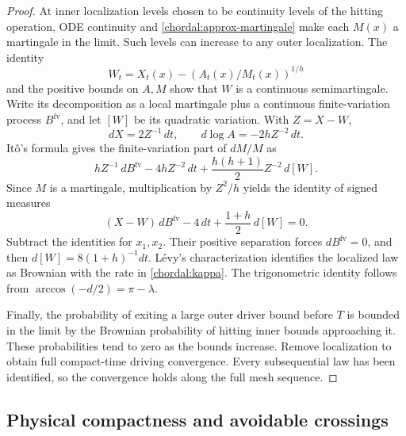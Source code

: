 \begin{proof}
At inner localization levels chosen to be continuity levels of the
hitting operation, ODE continuity and
\eqref{chordal:approx-martingale} make each $M(x)$ a martingale in
the limit.  Such levels can increase to any outer localization.
The identity
\[
 W_t=X_t(x)-\left(A_t(x)/M_t(x)\right)^{1/h}
\]
and the positive bounds on $A,M$ show that $W$ is a continuous
semimartingale.  Write its decomposition as a local martingale plus
a continuous finite-variation process $B^{\mathrm{fv}}$, and let
$[W]$ be its quadratic variation.  With $Z=X-W$,
\[
 dX=2Z^{-1}\,dt,\qquad d\log A=-2hZ^{-2}\,dt.
\]
It\^o's formula gives the finite-variation part of $dM/M$ as
\[
 hZ^{-1}\,dB^{\mathrm{fv}}-4hZ^{-2}\,dt
       +\frac{h(h+1)}2Z^{-2}\,d[W].
\]
Since $M$ is a martingale, multiplication by $Z^2/h$ yields the
identity of signed measures
\begin{equation}\label{chordal:characteristics}
 (X-W)\,dB^{\mathrm{fv}}-4\,dt
       +\frac{1+h}{2}\,d[W]=0.
\end{equation}
Subtract the identities for $x_1,x_2$.  Their positive separation
forces $dB^{\mathrm{fv}}=0$, and then
$d[W]=8(1+h)^{-1}dt$.  L\'evy's characterization identifies the
localized law as Brownian with the rate in \eqref{chordal:kappa}.
The trigonometric identity follows from
$\arccos(-d/2)=\pi-\lambda$.

Finally, the probability of exiting a large outer driver bound
before $T$ is bounded in the limit by the Brownian probability of
hitting inner bounds approaching it.  These probabilities tend to
zero as the bounds increase.  Remove localization to obtain full
compact-time driving convergence.  Every subsequential law has been
identified, so the convergence holds along the full mesh sequence.
\end{proof}

\subsection{Physical compactness and avoidable crossings}


